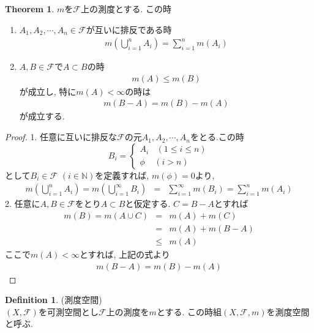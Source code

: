 \documentclass[11pt, a4paper, dvipdfmx]{jsbook}
\theoremstyle{definition}
\newtheorem{Definition+}[Axiom+]{Definition}
\newtheorem{Theorem+}[Axiom+]{Theorem}
\newcommand{\N}{\mathbb{N}}
\newcommand{\F}{\mathcal{F}}
\begin{document}
\newpage
\begin{Theorem+}
$m$を$\F$上の測度とする. この時
\begin{enumerate}
  \item $A_{1},A_{2}, \cdots, A_{n}\in\F$が互いに排反である時
  \begin{align*}
      m\left(\bigcup_{i = 1}^{n}A_{i}\right) = \sum_{i = 1}^{n} m(A_{i})
  \end{align*} 
  \item $A, B\in\F$で$A\subset B$の時
  \begin{align*}
    m(A) \leq m(B)
  \end{align*}
  が成立し, 特に$m(A)<\infty$の時は
  \begin{align*}
    m(B - A) = m(B) - m(A)
  \end{align*}
  が成立する.
\end{enumerate}
\begin{proof}
  1. 任意に互いに排反な$\F$の元$A_{1}, A_{2},\cdots, A_{n}$をとる.この時
  \begin{equation*}
    B_{i} =
    \begin{cases}
    A_{i} ~~~~(1 \leq i \leq n) \\
    \phi  ~~~~~(i > n)
  \end{cases}
  \end{equation*}
  として$B_{i}\in\F$ $(i\in\N)$を定義すれば, $m(\phi) = 0$より,
  \begin{eqnarray*}
    m\left(\bigcup_{i = 1}^{n} A_{i}\right) =  m\left(\bigcup_{i = 1}^{\infty} B_{i}\right)&=& \sum_{i = 1}^{\infty}m(B_{i})
                                                = \sum_{i = 1}^{n} m (A_{i})
  \end{eqnarray*}
  2. 任意に$A, B\in\F$をとり$A\subset B$と仮定する. $C = B - A$とすれば
  \begin{eqnarray*}
    m(B) = m(A\cup C) &=& m(A) + m(C) \nonumber \\
                      &=& m(A) + m(B-A)\\
                      &\leq&m(A)\nonumber
  \end{eqnarray*}
  ここで$m(A)<\infty$とすれば, 上記の式より
  \begin{align*}
    m(B-A) = m(B) - m(A)
  \end{align*}
\end{proof}
\end{Theorem+}  
\begin{Definition+}(測度空間)\\
  $(X, \F)$を可測空間とし$\F$上の測度を$m$とする. この時組$(X, \F, m)$を測度空間と呼ぶ.
\end{Definition+}
\end{document}
